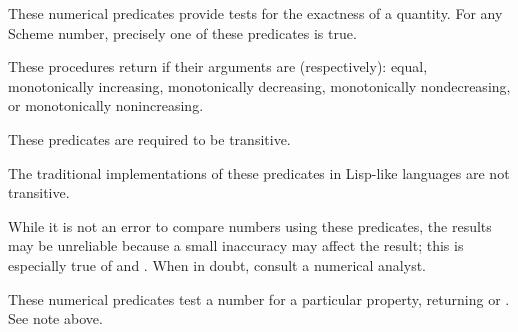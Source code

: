 \begin{entry}{%
}

These numerical predicates provide tests for the exactness of a
quantity.  For any Scheme number, precisely one of these predicates
is true.

\end{entry}


\begin{entry}{%
}

These procedures return \schtrue{} if their arguments are (respectively):
equal, monotonically increasing, monotonically decreasing,
monotonically nondecreasing, or monotonically nonincreasing.

These predicates are required to be transitive.

\begin{note}
The traditional implementations of these predicates in Lisp-like
languages are not transitive.
\end{note}

\begin{note}
While it is not an error to compare  numbers using these
predicates, the results may be unreliable because a small inaccuracy
may affect the result; this is especially true of \ide{=} and .
When in doubt, consult a numerical analyst.
\end{note}

\end{entry}

\begin{entry}{%
}

These numerical predicates test a number for a particular property,
returning \schtrue{} or \schfalse.  See note above.

\end{entry}

